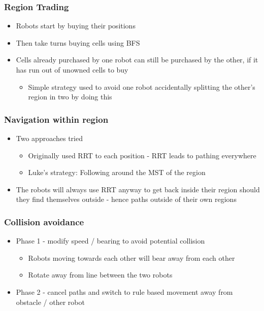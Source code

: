 \documentclass{beamer}
\begin{document}
    \begin{frame}
        \frametitle{Region Trading}
        \begin{itemize}
        \item Robots start by buying their positions
        \item Then take turns buying cells using BFS
        \item Cells already purchased by one robot can still be purchased by the other, if it has run out of unowned cells to buy
            \begin{itemize}
            \item Simple strategy used to avoid one robot accidentally splitting the other's region in two by doing this
            \end{itemize}
        \end{itemize}
    \end{frame}
    
    
    
    \begin{frame}
        \frametitle{Navigation within region}
        
        \begin{itemize}
        \item Two approaches tried
        \begin{itemize}
        \item Originally used RRT to each position - RRT leads to pathing everywhere
        \item Luke's strategy: Following around the MST of the region
        \end{itemize}
        \item The robots will always use RRT anyway to get back inside their region should they find themselves outside - hence paths outside of their own regions
        \end{itemize}
    
    \end{frame}
    
    \begin{frame}
        \frametitle{Collision avoidance}
        
        \begin{itemize}
        \item Phase 1 - modify speed / bearing to avoid potential collision
        \begin{itemize}
        \item Robots moving towards each other will bear away from each other
        \item Rotate away from line between the two robots
        \end{itemize}
        \item Phase 2 - cancel paths and switch to rule based movement away from obstacle / other robot
        \end{itemize}
    \end{frame}
    
\end{document}

